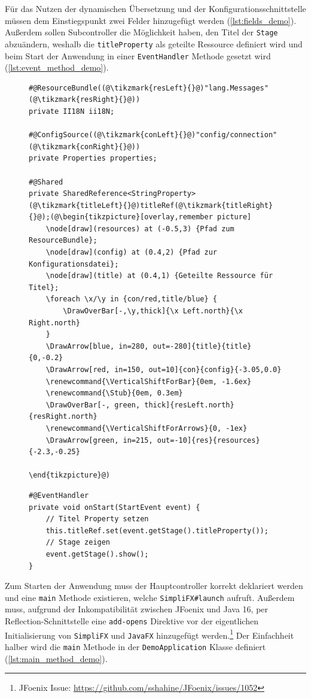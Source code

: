 \noindent Für das Nutzen der dynamischen Übersetzung und der Konfigurationsschnittstelle müssen dem Einstiegspunkt zwei Felder hinzugefügt werden (\autoref{lst:fields_demo}). Außerdem sollen Subcontroller die Möglichkeit haben, den Titel der \texttt{Stage} abzuändern, weshalb die \texttt{titleProperty} als geteilte Ressource definiert wird und beim Start der Anwendung in einer \texttt{EventHandler} Methode gesetzt wird (\autoref{lst:event_method_demo}).
\begin{figure}[H]
	\begin{lstlisting}[caption=Demo -- Benötigte Felder, captionpos=b, label=lst:fields_demo]
#@ResourceBundle((@\tikzmark{resLeft}{}@)"lang.Messages"(@\tikzmark{resRight}{}@))
private II18N ii18N;

#@ConfigSource((@\tikzmark{conLeft}{}@)"config/connection"(@\tikzmark{conRight}{}@))
private Properties properties;

#@Shared
private SharedReference<StringProperty> (@\tikzmark{titleLeft}{}@)titleRef(@\tikzmark{titleRight}{}@);(@\begin{tikzpicture}[overlay,remember picture]
	\node[draw](resources) at (-0.5,3) {Pfad zum ResourceBundle};
	\node[draw](config) at (0.4,2) {Pfad zur Konfigurationsdatei};
	\node[draw](title) at (0.4,1) {Geteilte Ressource für Titel};
	\foreach \x/\y in {con/red,title/blue} {
		\DrawOverBar[-,\y,thick]{\x Left.north}{\x Right.north}
	}
	\DrawArrow[blue, in=280, out=-280]{title}{title}{0,-0.2}
	\DrawArrow[red, in=150, out=10]{con}{config}{-3.05,0.0}
	\renewcommand{\VerticalShiftForBar}{0em, -1.6ex}
	\renewcommand{\Stub}{0em, 0.3em}
	\DrawOverBar[-, green, thick]{resLeft.north}{resRight.north}
	\renewcommand{\VerticalShiftForArrows}{0, -1ex}
	\DrawArrow[green, in=215, out=-10]{res}{resources}{-2.3,-0.25}

\end{tikzpicture}@)
	\end{lstlisting}
\end{figure}
\begin{figure}[H]
	\begin{lstlisting}[caption=Demo -- Start EventHandler, captionpos=b, label=lst:event_method_demo]
#@EventHandler
private void onStart(StartEvent event) {
	// Titel Property setzen
    this.titleRef.set(event.getStage().titleProperty());
	// Stage zeigen
    event.getStage().show();
}
	\end{lstlisting}
\end{figure}
\noindent Zum Starten der Anwendung muss der Hauptcontroller korrekt deklariert werden und eine \texttt{main} Methode existieren, welche \texttt{SimpliFX\#launch} aufruft. Außerdem muss, aufgrund der Inkompatibilität zwischen JFoenix und Java 16, per Reflection-Schnittstelle eine \texttt{add-opens} Direktive vor der eigentlichen Initialisierung von \texttt{SimpliFX} und \texttt{JavaFX} hinzugefügt werden.\footnote{JFoenix Issue: \url{https://github.com/sshahine/JFoenix/issues/1052}} Der Einfachheit halber wird die \texttt{main} Methode in der \texttt{DemoApplication} Klasse definiert (\autoref{lst:main_method_demo}).
